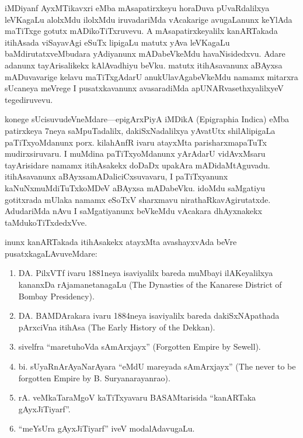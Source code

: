 \documentclass[11pt,a4size]{article}
\begin{document}
iMDiyanf AyxMTikavxri eMba mAsapatirxkeyu horaDuva pUvaRdalilxya
leVKagaLu alolxMdu ilolxMdu iruvadariMda vAcakarige avugaLanunx
keYlAda maTiTxge gotutx mADikoTiTxruvevu. A mAsapatirxkeyalilx
kanARTakada itihAsada viSayavAgi eSuTx lipigaLu matutx yAva leVKagaLu
baMdirutatxveMbudara yAdiyanunx mADabeVkeMdu havaNisidedxvu. Adare
adanunx tayArisalikekx kAlAvadhiyu beVku. matutx itihAsavanunx aBAyxsa
mADuvavarige kelavu maTiTxgAdarU anukUlavAgabeVkeMdu namamx mitarxra
sUcaneya meVrege I pusatxkavanunx avasaradiMda apUNARvasethxyalilxyeV
tegediruvevu.

konege sUcisuvudeVneMdare---epigArxPiyA iMDikA {\rm
    (Epigraphia Indica)} eMba patirxkeya 7neya saMpuTadalilx,
    dakiSxNadalilxya yAvatUtx shilAlipigaLa paTiTxyoMdanunx
    porx. kilahAnfR ivaru atayxMta parisharxmapaTuTx mudirxsiruvaru. I
    muMdina paTiTxyoMdanunx yArAdarU vidAvxMsaru tayArisidare namamx
    itihAsakekx doDaDx upakAra mADidaMtAguvadu. itihAsavanunx
    aBAyxsamADaliciCxsuvavaru, I paTiTxyanunx kaNuNxmuMdiTuTxkoMDeV
    aBAyxsa mADabeVku. idoMdu saMgatiyu gotitxrada mUlaka namamx
    eSoTxV sharxmavu nirathaRkavAgirutatxde. AdudariMda nAvu I
    saMgatiyanunx beVkeMdu vAcakara dhAyxnakekx taMdukoTiTxdedxVve.

inunx kanARTakada itihAsakekx atayxMta avashayxvAda beVre
pusatxkagaLAvuveMdare: 
\begin{enumerate}
\renewcommand{\labelenumi}{(\theenumi)}
\item DA. PilxVTf ivaru 1881neya isaviyalilx
bareda muMbayi ilAKeyalilxya kananxDa rAjamanetanagaLu
{\rm (The Dynasties of the Kanarese District of Bombay
    Presidency).} 

\item DA. BAMDArakara ivaru 1884neya isaviyalilx bareda
dakiSxNApathada pArxciVna itihAsa {\rm (The Early
    History of the Dekkan)}. 

\item sivelfra ``maretuhoVda sAmArxjayx''
{\rm (Forgotten Empire by Sewell)}.

\item bi. sUyaRnArAyaNarAyara ``eMdU mareyada sAmArxjayx''
{\rm (The never to be forgotten Empire by
    B. Suryanarayanrao)}. 

\item rA. veMkaTaraMgoV kaTiTxyavaru
BASAMtarisida ``kanARTaka gAyxJiTiyarf''.

\item ``meYsUra gAyxJiTiyarf''
iveV modalAdavugaLu.
\end{enumerate}
\end{document}
